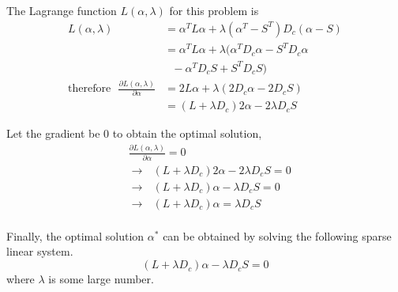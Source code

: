 \documentclass[journal]{IEEEtran}
\DeclareMathOperator*{\argmin}{argmin}
\begin{document}
The Lagrange function $L(\alpha, \lambda)$ for this problem is 
\begin{equation}
    \begin{aligned}
       L(\alpha, \lambda) &= \alpha^{T} L \alpha + \lambda (\alpha^T-S^T)D_c (\alpha - S) \\
       & = \alpha^{T} L \alpha + \lambda (\alpha^{T}D_c \alpha - S^T D_c \alpha \\
       &~~~- \alpha^T D_c S + S^T D_c S) \\
    \text{therefore}~~~\frac{\partial L(\alpha, \lambda)}{\partial \alpha} &= 2L\alpha + \lambda (2D_c \alpha - 2D_c S)\\
        &= (L + \lambda D_c)2\alpha - 2 \lambda D_c S 
    \end{aligned}
    \label{equ17}
\end{equation}

Let the gradient be 0 to obtain the optimal solution,
\begin{equation}
    \begin{aligned}
       &\frac{\partial L(\alpha, \lambda)}{\partial \alpha} = 0 \\
       &\rightarrow~~~(L + \lambda D_c) 2 \alpha - 2 \lambda D_c S = 0\\
       &\rightarrow~~~(L + \lambda D_c) \alpha - \lambda D_c S = 0\\
       &\rightarrow~~~(L + \lambda D_c) \alpha = \lambda D_c S \\
    \end{aligned}
    \label{equ18}
\end{equation}

Finally, the optimal solution $\alpha^{*}$ can be obtained by solving the following sparse linear system.
\begin{equation}
    (L+\lambda D_c)\alpha - \lambda D_c S = 0
    \label{equ19}
\end{equation}
where $\lambda$ is some large number.

\end{document}
